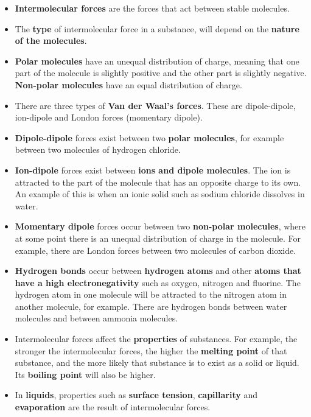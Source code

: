 \begin{itemize}
\item{\textbf{Intermolecular forces} are the forces that act between stable molecules.}
\item{The \textbf{type} of intermolecular force in a substance, will depend on the \textbf{nature of the molecules}.}
\item{\textbf{Polar molecules} have an unequal distribution of charge, meaning that one part of the molecule is slightly positive and the other part is slightly negative. \textbf{Non-polar molecules} have an equal distribution of charge.}
\item{There are three types of \textbf{Van der Waal's forces}. These are dipole-dipole, ion-dipole and London forces (momentary dipole).}
\item{\textbf{Dipole-dipole} forces exist between two \textbf{polar molecules}, for example between two molecules of hydrogen chloride.}
\item{\textbf{Ion-dipole} forces exist between \textbf{ions and dipole molecules}. The ion is attracted to the part of the molecule that has an opposite charge to its own. An example of this is when an ionic solid such as sodium chloride dissolves in water.}
\item{\textbf{Momentary dipole} forces occur between two \textbf{non-polar molecules}, where at some point there is an unequal distribution of charge in the molecule. For example, there are London forces between two molecules of carbon dioxide.}
\item{\textbf{Hydrogen bonds} occur between \textbf{hydrogen atoms} and other \textbf{atoms that have a high electronegativity} such as oxygen, nitrogen and fluorine. The hydrogen atom in one molecule will be attracted to the nitrogen atom in another molecule, for example. There are hydrogen bonds between water molecules and between ammonia molecules.}
\item{Intermolecular forces affect the \textbf{properties} of substances. For example, the stronger the intermolecular forces, the higher the \textbf{melting point} of that substance, and the more likely that substance is to exist as a solid or liquid. Its \textbf{boiling point} will also be higher.}
\item{In \textbf{liquids}, properties such as \textbf{surface tension}, \textbf{capillarity} and \textbf{evaporation} are the result of intermolecular forces.}
\end{itemize}

